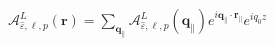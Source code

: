 \documentclass{article}
\begin{document}
$\boldsymbol{\mathcal{A}}_{\hat{\varepsilon},\ell,p}^{L}(\mathbf{r}) = \sum_{\mathbf{q}_{\parallel}} \boldsymbol{\mathcal{A}}_{\hat{\varepsilon},\ell,p}^{L}(\mathbf{q}_{\parallel}) e^{i\mathbf{q}_{\parallel} \cdot \mathbf{r}_{\parallel}} e^{i q_0 z}$
\end{document}
